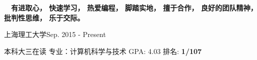 \documentclass{sorahjy_cv}
\begin{document}
\pagestyle{empty}


\begin{cvHeader}
\end{cvHeader}


%
%

\begin{description}{}
	\item{\ \ }\textbf{有进取心， 快速学习， 热爱编程， 脚踏实地， 擅于合作， 良好的团队精神， 批判性思维， 乐于交际。}
\end{description}


%
%

\begin{sectionContentSimple}{上海理工大学}{Sep. 2015 - Present}
	\item 本科大三在读 \quad 专业：计算机科学与技术 \quad GPA: 4.03 \quad 排名: \textbf{1/107} 
\end{sectionContentSimple}

%
%






%
%
\end{document}
